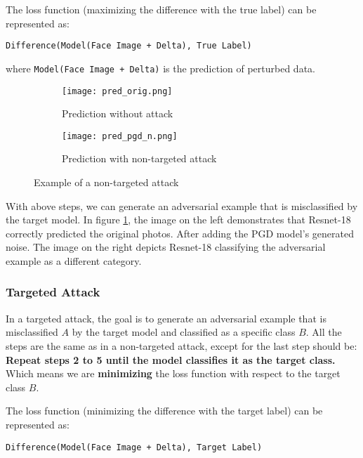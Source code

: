 The loss function (maximizing the difference with the true label) can be represented as:

\begin{center}
    \verb|Difference(Model(Face Image + Delta), True Label)|
\end{center}

where \verb|Model(Face Image + Delta)| is the prediction of perturbed data.


\begin{figure}[htbp]
    \centering
    \begin{subfigure}{0.4\textwidth}
        \centering
        \texttt{[image: pred\_orig.png]}
        \caption{Prediction without attack}
    \end{subfigure}
    \qquad
    \begin{subfigure}{0.4\textwidth}
        \centering
        \texttt{[image: pred\_pgd\_n.png]}
        \caption{Prediction with non-targeted attack}
    \end{subfigure}
    \caption{Example of a non-targeted attack}
    \label{fig:pdf_attack_example}
\end{figure}

With above steps, we can generate an adversarial example that is misclassified by the target model. In figure \ref{fig:pdf_attack_example}, the image on the left demonstrates that Resnet-18 correctly predicted the original photos. After adding the PGD model's generated noise. The image on the right depicts Resnet-18 classifying the adversarial example as a different category.

\subsubsection{Targeted Attack}

In a targeted attack, the goal is to generate an adversarial example that is misclassified $A$ by the target model and classified as a specific class $B$. All the steps are the same as in a non-targeted attack, except for the last step should be: \textbf{Repeat steps 2 to 5 until the model classifies it as the target class.} Which means we are \textbf{minimizing} the loss function with respect to the target class $B$.

The loss function (minimizing the difference with the target label) can be represented as:

\begin{center}
    \verb|Difference(Model(Face Image + Delta), Target Label)|
\end{center}
